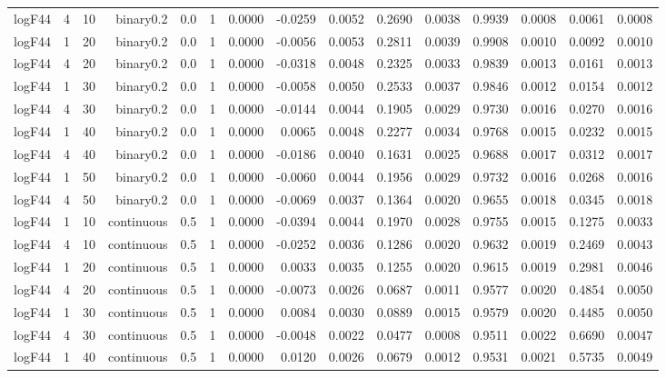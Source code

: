 \begin{longtable}{rrrrrrrrrrrrrrr}
  logF44 & 4 & 10 & binary0.2 & 0.0 & 1 & 0.0000 & -0.0259 & 0.0052 & 0.2690 & 0.0038 & 0.9939 & 0.0008 & 0.0061 & 0.0008 \\ 
  logF44 & 1 & 20 & binary0.2 & 0.0 & 1 & 0.0000 & -0.0056 & 0.0053 & 0.2811 & 0.0039 & 0.9908 & 0.0010 & 0.0092 & 0.0010 \\ 
  logF44 & 4 & 20 & binary0.2 & 0.0 & 1 & 0.0000 & -0.0318 & 0.0048 & 0.2325 & 0.0033 & 0.9839 & 0.0013 & 0.0161 & 0.0013 \\ 
  logF44 & 1 & 30 & binary0.2 & 0.0 & 1 & 0.0000 & -0.0058 & 0.0050 & 0.2533 & 0.0037 & 0.9846 & 0.0012 & 0.0154 & 0.0012 \\ 
  logF44 & 4 & 30 & binary0.2 & 0.0 & 1 & 0.0000 & -0.0144 & 0.0044 & 0.1905 & 0.0029 & 0.9730 & 0.0016 & 0.0270 & 0.0016 \\ 
  logF44 & 1 & 40 & binary0.2 & 0.0 & 1 & 0.0000 & 0.0065 & 0.0048 & 0.2277 & 0.0034 & 0.9768 & 0.0015 & 0.0232 & 0.0015 \\ 
  logF44 & 4 & 40 & binary0.2 & 0.0 & 1 & 0.0000 & -0.0186 & 0.0040 & 0.1631 & 0.0025 & 0.9688 & 0.0017 & 0.0312 & 0.0017 \\ 
  logF44 & 1 & 50 & binary0.2 & 0.0 & 1 & 0.0000 & -0.0060 & 0.0044 & 0.1956 & 0.0029 & 0.9732 & 0.0016 & 0.0268 & 0.0016 \\ 
  logF44 & 4 & 50 & binary0.2 & 0.0 & 1 & 0.0000 & -0.0069 & 0.0037 & 0.1364 & 0.0020 & 0.9655 & 0.0018 & 0.0345 & 0.0018 \\ 
  logF44 & 1 & 10 & continuous & 0.5 & 1 & 0.0000 & -0.0394 & 0.0044 & 0.1970 & 0.0028 & 0.9755 & 0.0015 & 0.1275 & 0.0033 \\ 
  logF44 & 4 & 10 & continuous & 0.5 & 1 & 0.0000 & -0.0252 & 0.0036 & 0.1286 & 0.0020 & 0.9632 & 0.0019 & 0.2469 & 0.0043 \\ 
  logF44 & 1 & 20 & continuous & 0.5 & 1 & 0.0000 & 0.0033 & 0.0035 & 0.1255 & 0.0020 & 0.9615 & 0.0019 & 0.2981 & 0.0046 \\ 
  logF44 & 4 & 20 & continuous & 0.5 & 1 & 0.0000 & -0.0073 & 0.0026 & 0.0687 & 0.0011 & 0.9577 & 0.0020 & 0.4854 & 0.0050 \\ 
  logF44 & 1 & 30 & continuous & 0.5 & 1 & 0.0000 & 0.0084 & 0.0030 & 0.0889 & 0.0015 & 0.9579 & 0.0020 & 0.4485 & 0.0050 \\ 
  logF44 & 4 & 30 & continuous & 0.5 & 1 & 0.0000 & -0.0048 & 0.0022 & 0.0477 & 0.0008 & 0.9511 & 0.0022 & 0.6690 & 0.0047 \\ 
  logF44 & 1 & 40 & continuous & 0.5 & 1 & 0.0000 & 0.0120 & 0.0026 & 0.0679 & 0.0012 & 0.9531 & 0.0021 & 0.5735 & 0.0049 \\ 

\end{longtable}
